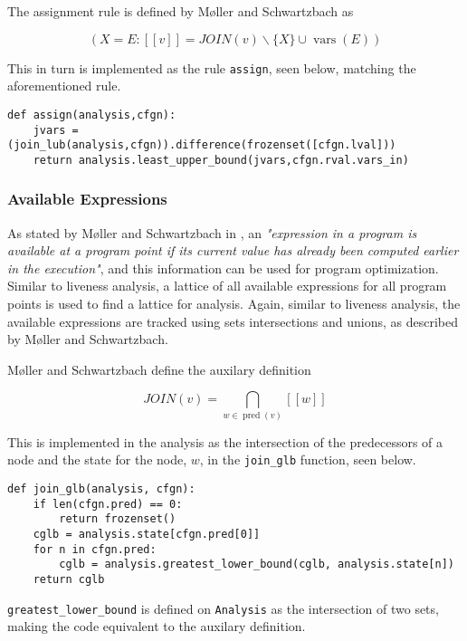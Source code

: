 \noindent The assignment rule is defined by Møller and Schwartzbach as

\begin{equation}
    (X=E: [[v]] = J O I N(v) \backslash\{X\} \cup \operatorname{vars}(E))
\end{equation}

\noindent This in turn is implemented as the rule \texttt{assign}, seen below, matching the aforementioned rule. 

\begin{verbatim}
def assign(analysis,cfgn):
    jvars = (join_lub(analysis,cfgn)).difference(frozenset([cfgn.lval]))
    return analysis.least_upper_bound(jvars,cfgn.rval.vars_in)
\end{verbatim}

\subsubsection{Available Expressions}
As stated by Møller and Schwartzbach in \cite{spa}, an \textit{"expression in a program is available at a program point if its current value has already been computed earlier in the execution"}, and this information can be used for program optimization. Similar to liveness analysis, a lattice of all available expressions for all program points is used to find a lattice for analysis. Again, similar to liveness analysis, the available expressions are tracked using sets intersections and unions, as described by Møller and Schwartzbach.

\newpar Møller and Schwartzbach define the auxilary definition

\begin{equation}
    J O I N (v) = \mathop{\bigcap}_{w \in \operatorname{pred}(v)} [[w]]
\end{equation}

\noindent This is implemented in the analysis as the intersection of the predecessors of a node and the state for the node, $w$, in the \texttt{join\_glb} function, seen below. 

\begin{verbatim}
def join_glb(analysis, cfgn):
    if len(cfgn.pred) == 0:
        return frozenset()
    cglb = analysis.state[cfgn.pred[0]]
    for n in cfgn.pred:
        cglb = analysis.greatest_lower_bound(cglb, analysis.state[n])
    return cglb
\end{verbatim}

\noindent \texttt{greatest\_lower\_bound} is defined on \texttt{Analysis} as the intersection of two sets, making the code equivalent to the auxilary definition. 

